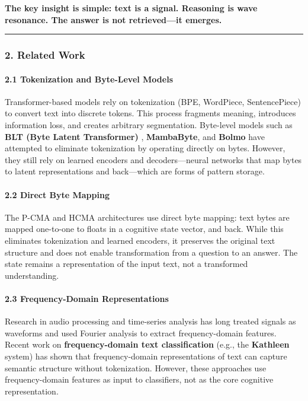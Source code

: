 \documentclass[
  11pt,
  a4paper,
]{article}
\begin{document}
\textbf{The key insight is simple: text is a signal. Reasoning is wave
resonance. The answer is not retrieved---it emerges.}

\begin{center}\rule{0.5\linewidth}{0.5pt}\end{center}

\subsubsection{2. Related Work}\label{related-work-2}

\paragraph{2.1 Tokenization and Byte-Level
Models}\label{tokenization-and-byte-level-models}

Transformer-based models rely on tokenization (BPE, WordPiece,
SentencePiece) to convert text into discrete tokens. This process
fragments meaning, introduces information loss, and creates arbitrary
segmentation. Byte-level models such as \textbf{BLT (Byte Latent
Transformer)} , \textbf{MambaByte}, and \textbf{Bolmo} have attempted to
eliminate tokenization by operating directly on bytes. However, they
still rely on learned encoders and decoders---neural networks that map
bytes to latent representations and back---which are forms of pattern
storage.

\paragraph{2.2 Direct Byte Mapping}\label{direct-byte-mapping}

The P-CMA and HCMA architectures use direct byte mapping: text bytes are
mapped one-to-one to floats in a cognitive state vector, and back. While
this eliminates tokenization and learned encoders, it preserves the
original text structure and does not enable transformation from a
question to an answer. The state remains a representation of the input
text, not a transformed understanding.

\paragraph{2.3 Frequency-Domain
Representations}\label{frequency-domain-representations}

Research in audio processing and time-series analysis has long treated
signals as waveforms and used Fourier analysis to extract
frequency-domain features. Recent work on \textbf{frequency-domain text
classification} (e.g., the \textbf{Kathleen} system) has shown that
frequency-domain representations of text can capture semantic structure
without tokenization. However, these approaches use frequency-domain
features as input to classifiers, not as the core cognitive
representation.
\end{document}
